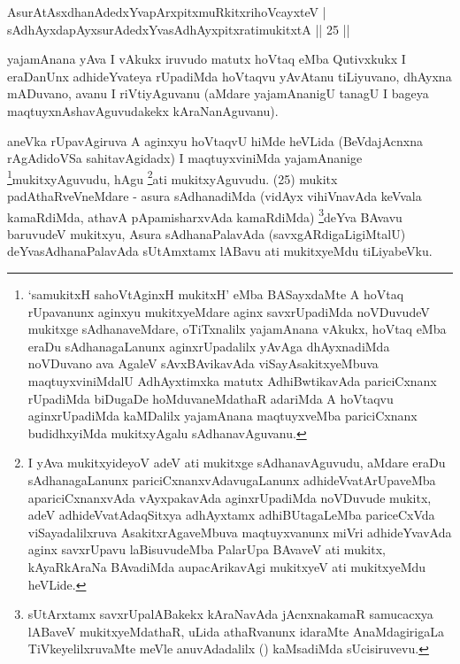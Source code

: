 \begin{shl}
AsurAtAsxdhanAdedxYvapArxpitxmuRkitxrihoVcayxteV |\\
sAdhAyxdapAyxsurAdedxYvasAdhAyxpitxratimukitxtA \hfill || 25 ||
\end{shl}

\begin{artha}
yajamAnana yAva I vAkukx iruvudo matutx hoVtaq eMba Qutivxkukx I eraDanUnx adhideYvateya rUpadiMda hoVtaqvu yAvAtanu tiLiyuvano, dhAyxna mADuvano, avanu I riVtiyAguvanu (aMdare yajamAnanigU tanagU I bageya maqtuyxnAshavAguvudakekx kAraNanAguvanu).
\end{artha}

\begin{artha}
aneVka rUpavAgiruva A aginxyu hoVtaqvU hiMde heVLida (BeVdajAcnxna rAgAdidoVSa sahitavAgidadx) I maqtuyxviniMda yajamAnanige \footnote[1]{`samukitxH sahoVtA\s ginxH mukitxH' eMba BASayxdaMte A hoVtaq rUpavanunx aginxyu mukitxyeMdare aginx savxrUpadiMda noVDuvudeV mukitxge sAdhanaveMdare, oTiTxnalilx yajamAnana vAkukx, hoVtaq eMba eraDu sAdhanagaLanunx aginxrUpadalilx yAvAga dhAyxnadiMda noVDuvano ava AgaleV sAvxBAvikavAda viSayAsakitxyeMbuva maqtuyxviniMdalU AdhAyxtimxka matutx AdhiBwtikavAda pariciCxnanx rUpadiMda biDugaDe hoMduvaneMdathaR adariMda A hoVtaqvu aginxrUpadiMda kaMDalilx yajamAnana maqtuyxveMba pariciCxnanx budidhxyiMda mukitxyAgalu sAdhanavAguvanu.}mukitxyAguvudu, hAgu \footnote[2]{I yAva mukitxyideyoV adeV ati mukitxge sAdhanavAguvudu, aMdare eraDu sAdhanagaLanunx pariciCxnanxvAdavugaLanunx adhideVvatArUpaveMba apariciCxnanxvAda vAyxpakavAda aginxrUpadiMda noVDuvude mukitx, adeV adhideVvatAdaqSitxya adhAyxtamx adhiBUtagaLeMba pariceCxVda viSayadalilxruva AsakitxrAgaveMbuva maqtuyxvanunx miVri adhideYvavAda aginx savxrUpavu laBisuvudeMba PalarUpa BAvaveV ati mukitx, kAyaRkAraNa BAvadiMda aupacArikavAgi mukitxyeV ati mukitxyeMdu heVLide.}ati mukitxyAguvudu. (25) mukitx padAthaRveVneMdare - asura sAdhanadiMda (vidAyx vihiVnavAda keVvala kamaRdiMda, athavA pApamisharxvAda kamaRdiMda) \footnote[1]{sUtArxtamx savxrUpalABakekx kAraNavAda jAcnxnakamaR samucacxya lABaveV mukitxyeMdathaR, uLida athaRvanunx idaraMte AnaMdagirigaLa TiVkeyelilxruvaMte meVle anuvAdadalilx (\quad) kaMsadiMda sUcisiruvevu.}deYva BAvavu baruvudeV mukitxyu, Asura sAdhanaPalavAda (savxgARdigaLigiMtalU) deYvasAdhanaPalavAda sUtAmxtamx lABavu ati mukitxyeMdu tiLiyabeVku.
\end{artha}


